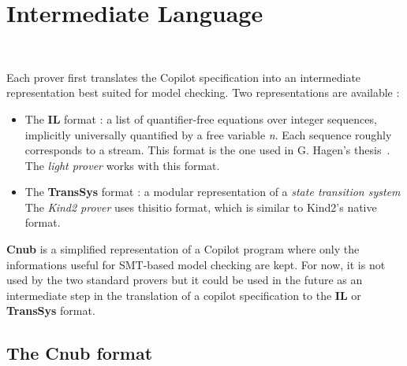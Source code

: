 \section{Intermediate Language}~\label{sec:il}

Each prover first translates the Copilot specification into an
intermediate representation best suited for model checking. Two
representations are available :

\begin{itemize}
\item
  The \textbf{IL} format : a list
  of quantifier-free equations over integer sequences, implicitly
  universally quantified by a free variable \emph{n}. Each sequence
  roughly corresponds to a stream. This format is the one used in G.
  Hagen's thesis~\cite{HagenPhD}. The \emph{light prover} works with this
  format.
\item
  The \textbf{TransSys} format : a modular representation of a \emph{state transition system} \cite{} The \emph{Kind2 prover} uses thisitio
  format, which is similar to Kind2's native format.
\end{itemize}

\textbf{Cnub} is a simplified representation of a Copilot program where
only the informations useful for SMT-based model checking are kept. For
now, it is not used by the two standard provers but it could be used in
the future as an intermediate step in the translation of a copilot specification to the \textbf{IL} or \textbf{TransSys} format.







\subsection{The \textbf{Cnub} format}

